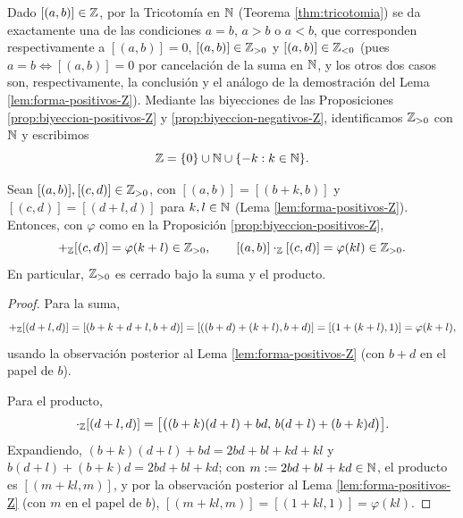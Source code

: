 \documentclass[12pt,a4paper]{book}
\begin{document}
    Dado $[(a,b)]\in\mathbb{Z}$, por la Tricotomía en $\mathbb{N}$ (Teorema \ref{thm:tricotomia}) se da exactamente una de las condiciones $a=b$, $a>b$ o $a<b$, que corresponden respectivamente a $[(a,b)]=0$, $[(a,b)]\in\mathbb{Z}_{>0}$ y $[(a,b)]\in\mathbb{Z}_{<0}$ (pues $a=b\iff[(a,b)]=0$ por cancelación de la suma en $\mathbb{N}$, y los otros dos casos son, respectivamente, la conclusión y el análogo de la demostración del Lema \ref{lem:forma-positivos-Z}). Mediante las biyecciones de las Proposiciones \ref{prop:biyeccion-positivos-Z} y \ref{prop:biyeccion-negativos-Z}, identificamos $\mathbb{Z}_{>0}$ con $\mathbb{N}$ y escribimos
    \begin{equation*}
        \mathbb{Z} = \{0\}\cup\mathbb{N}\cup\{-k:k\in\mathbb{N}\}.
    \end{equation*}

    \begin{proposicion}
        \label{prop:cerradura-positivos-Z}
        Sean $[(a,b)],[(c,d)]\in\mathbb{Z}_{>0}$, con $[(a,b)]=[(b+k,b)]$ y $[(c,d)]=[(d+l,d)]$ para $k,l\in\mathbb{N}$ (Lema \ref{lem:forma-positivos-Z}). Entonces, con $\varphi$ como en la Proposición \ref{prop:biyeccion-positivos-Z},
        \begin{equation*}
            [(a,b)]+_{\Z}[(c,d)] = \varphi(k+l) \in\Z_{>0}, \qquad [(a,b)]\cdot_{\Z}[(c,d)] = \varphi(kl) \in\Z_{>0}.
        \end{equation*}
        En particular, $\mathbb{Z}_{>0}$ es cerrado bajo la suma y el producto.
    \end{proposicion}
    \begin{proof}
        Para la suma,
        \begin{equation*}
            [(b+k,b)]+_{\Z}[(d+l,d)] = [(b+k+d+l,b+d)] = [((b+d)+(k+l),b+d)] = [(1+(k+l),1)] = \varphi(k+l),
        \end{equation*}
        usando la observación posterior al Lema \ref{lem:forma-positivos-Z} (con $b+d$ en el papel de $b$).

        Para el producto,
        \begin{equation*}
            [(b+k,b)]\cdot_{\Z}[(d+l,d)] = \big[\big((b+k)(d+l)+bd,\,b(d+l)+(b+k)d\big)\big].
        \end{equation*}
        Expandiendo, $(b+k)(d+l)+bd=2bd+bl+kd+kl$ y $b(d+l)+(b+k)d=2bd+bl+kd$; con $m:=2bd+bl+kd\in\mathbb{N}$, el producto es $[(m+kl,m)]$, y por la observación posterior al Lema \ref{lem:forma-positivos-Z} (con $m$ en el papel de $b$), $[(m+kl,m)]=[(1+kl,1)]=\varphi(kl)$.
    \end{proof}
\end{document}
